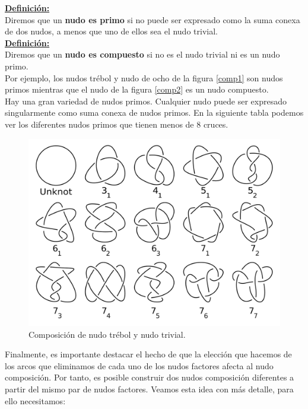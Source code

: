 \documentclass[14pt]{extarticle}
\begin{document}
 \underline{\textbf{ Definición:}}\\
 Diremos que un \textbf{nudo es primo} si no puede ser expresado como la suma conexa de dos nudos, a menos que uno de ellos sea el nudo trivial. \\
 
\underline{ \textbf{ Definición:}}\\
 Diremos que un \textbf{nudo es compuesto} si no es el nudo trivial ni es un nudo primo.\\
  
  Por ejemplo, los nudos trébol y nudo de ocho de la figura \ref{comp1} son nudos primos mientras que el nudo de la figura \ref{comp2} es un nudo compuesto. \\ 
  
  Hay una gran variedad de nudos primos. Cualquier nudo puede ser expresado singularmente como suma conexa de nudos primos. En la siguiente tabla podemos ver los diferentes nudos primos que tienen menos de 8 cruces.\\
        \begin{figure}[h!]
        	\includegraphics[width=14cm]{inudos/tableknot.png}
        	\centering
        	\caption{Composición de nudo trébol y nudo trivial.}
        	\label{comp6} 
        \end{figure}
  
  
  
    
    Finalmente, es importante destacar el hecho de que la elección que hacemos de los arcos que eliminamos de cada uno de los nudos factores afecta al nudo composición. Por tanto, es posible construir dos nudos composición diferentes a partir del mismo par de nudos factores. Veamos esta idea con más detalle, para ello necesitamos:\\
    
\end{document}
